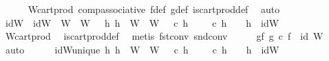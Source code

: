\begin{isabellebody}
\ \ \ \ \isamarkupfalse%
\ W{\isacharunderscore}{\kern0pt}cart{\isacharunderscore}{\kern0pt}prod\ comp{\isacharunderscore}{\kern0pt}associative{}\ f{\isacharunderscore}{\kern0pt}def\ g{\isacharunderscore}{\kern0pt}def\ is{\isacharunderscore}{\kern0pt}cart{\isacharunderscore}{\kern0pt}prod{\isacharunderscore}{\kern0pt}def\ \isamarkupfalse%
\ auto\isanewline
\isanewline
\ \ \isamarkupfalse%
\ idW\ \ {\isachardoublequoteopen}idW\ {\isacharcolon}{\kern0pt}\ W\ {\isasymrightarrow}\ W\ {\isasymand}\ {\isacharparenleft}{\kern0pt}{\isasymforall}\ h{}{\isachardot}{\kern0pt}\ {\isacharparenleft}{\kern0pt}h{}\ {\isacharcolon}{\kern0pt}\ W\ {\isasymrightarrow}\ W\ {\isasymand}\ {\isasympi}\ {\isasymcirc}\isactrlsub c\ h{}\ {\isacharequal}{\kern0pt}\ {\isasympi}\ {\isasymand}\ {\isasympi}\ {\isasymcirc}\isactrlsub c\ h{}\ {\isacharequal}{\kern0pt}\ {\isasympi}\ {\isasymlongrightarrow}\ h{}\ {\isacharequal}{\kern0pt}\ idW{\isacharparenright}{\kern0pt}{\isachardoublequoteclose}\isanewline
\ \ \ \ \isamarkupfalse%
\ W{\isacharunderscore}{\kern0pt}cart{\isacharunderscore}{\kern0pt}prod\ \isamarkupfalse%
\ is{\isacharunderscore}{\kern0pt}cart{\isacharunderscore}{\kern0pt}prod{\isacharunderscore}{\kern0pt}def\ \isamarkupfalse%
\ {\isacharparenleft}{\kern0pt}metis\ fst{\isacharunderscore}{\kern0pt}conv\ snd{\isacharunderscore}{\kern0pt}conv{\isacharparenright}{\kern0pt}\isanewline
\ \ \isamarkupfalse%
\ \isamarkupfalse%
\ gf{\isacharcolon}{\kern0pt}\ {\isachardoublequoteopen}g\ {\isasymcirc}\isactrlsub c\ f\ {\isacharequal}{\kern0pt}\ id\ W{\isachardoublequoteclose}\isanewline
\ \ \isamarkupfalse%
\ auto\isanewline
\ \ \ \ \isamarkupfalse%
\ idW{\isacharunderscore}{\kern0pt}unique{\isacharcolon}{\kern0pt}\ {\isachardoublequoteopen}{\isasymforall}h{}{\isachardot}{\kern0pt}\ h{}\ {\isacharcolon}{\kern0pt}\ W\ {\isasymrightarrow}\ W\ {\isasymand}\ {\isasympi}\ {\isasymcirc}\isactrlsub c\ h{}\ {\isacharequal}{\kern0pt}\ {\isasympi}\ {\isasymand}\ {\isasympi}\ {\isasymcirc}\isactrlsub c\ h{}\ {\isacharequal}{\kern0pt}\ {\isasympi}\ {\isasymlongrightarrow}\ h{}\ {\isacharequal}{\kern0pt}\ idW{\isachardoublequoteclose}\isanewline

\end{isabellebody}
